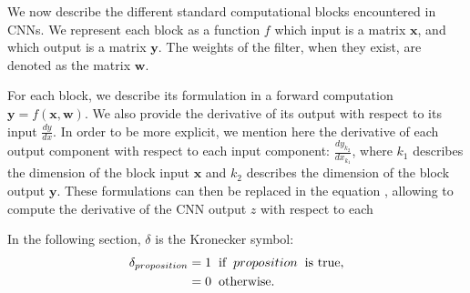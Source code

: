We now describe the different standard computational blocks encountered in CNNs. 
We represent each block as a function $f$ which input is a matrix $\mathbf{x}$, and which output is a matrix
$\mathbf{y}$. The weights of the filter, when they exist, are denoted as the matrix $\mathbf{w}$.

  \begin{center}
  \end{center}
  
For each block, we describe its formulation in a forward computation $\mathbf{y} = f(\mathbf{x},\mathbf{w})$.
We also provide the derivative of its output with respect to its input $\frac{dy}{dx}$. In order to be more explicit, we mention here the derivative 
of each output component with respect to each input component: $\frac{dy_{k_2}}{dx_{k_1}}$, where $k_1$ describes the dimension of the block input 
$\mathbf{x}$ and $k_2$ describes the dimension of the block output $\mathbf{y}$.  
These formulations can then be replaced in the equation %
, allowing to compute the derivative of the CNN output $z$ with respect to each 


In the following section, $\delta$ is the Kronecker symbol: 
\begin{align}
  \delta_{proposition} &= 1 \hspace{0.2cm} \text{if} \hspace{0.2cm}  proposition \hspace{0.2cm} \text{is true}, \nonumber \\ 
                       &= 0 \hspace{0.2cm} \text{otherwise}. \nonumber
\end{align}